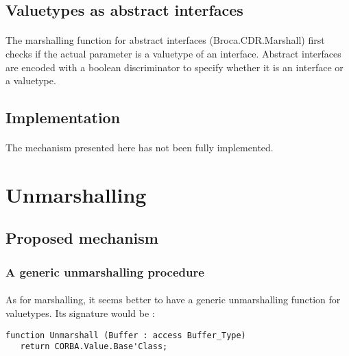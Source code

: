\subsection{Valuetypes as abstract interfaces}
\paragraph{}The marshalling function for abstract interfaces
     (Broca.CDR.Marshall) first checks if the actual parameter is a
     valuetype of an interface. Abstract interfaces are encoded with a
     boolean discriminator to specify whether it is an interface or a
     valuetype.

\subsection{Implementation}
\paragraph{}The mechanism presented here has not been fully
     implemented.

\section{Unmarshalling}


\subsection{Proposed mechanism}

\subsubsection{A generic unmarshalling procedure}

\paragraph{}As for marshalling, it seems better to have a generic unmarshalling
function for valuetypes. Its signature would be :

\begin{verbatim}
function Unmarshall (Buffer : access Buffer_Type)
   return CORBA.Value.Base'Class;
\end{verbatim}

